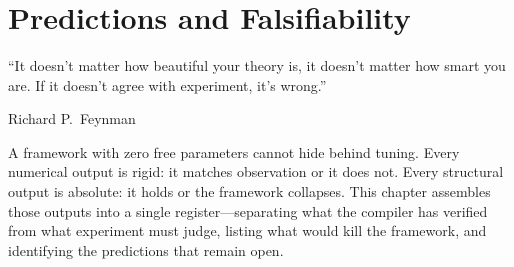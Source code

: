 \documentclass[11pt,a4paper]{book}
\begin{document}
\begin{code}
\<%
\\
\>[0][@{}l@{\AgdaIndent{0}}]%
\>[2]\<%
\\
\>[2][@{}l@{\AgdaIndent{0}}]%
\>[4]\<%
\\
%
\>[4]\AgdaSpace{}%
\AgdaSymbol{:}\AgdaSpace{}%
\<%
\\
%
\>[4]\<%
\\
%
\>[4]%
\>[21]\AgdaSymbol{:}\AgdaSpace{}%
\AgdaSpace{}%
\AgdaSpace{}%
\<%
\\
%
\\[\AgdaEmptyExtraSkip]%
\>[0]\AgdaSpace{}%
\AgdaSymbol{:}\AgdaSpace{}%
\<%
\\
\>[0]\AgdaSpace{}%
\AgdaSymbol{=}\AgdaSpace{}%
\<%
\\
\>[0][@{}l@{\AgdaIndent{0}}]%
\>[2]\AgdaSymbol{\{}\AgdaSpace{}%
\AgdaSpace{}%
\AgdaSymbol{=}\AgdaSpace{}%
\<%
\\
%
\>[2]\AgdaSymbol{;}\AgdaSpace{}%
%
\>[21]\AgdaSymbol{=}\AgdaSpace{}%
\AgdaSpace{}%
\AgdaSymbol{\}}\<%
\end{code}


\chapter{Predictions and Falsifiability}
\label{ch:predictions}

\epigraph{``It doesn't matter how beautiful your theory is, it doesn't matter how smart you are. If it doesn't agree with experiment, it's wrong.''}{Richard P.~Feynman}

A framework with zero free parameters cannot hide behind tuning. Every numerical output is rigid: it matches observation or it does not. Every structural output is absolute: it holds or the framework collapses. This chapter assembles those outputs into a single register---separating what the compiler has verified from what experiment must judge, listing what would kill the framework, and identifying the predictions that remain open.
\end{document}
